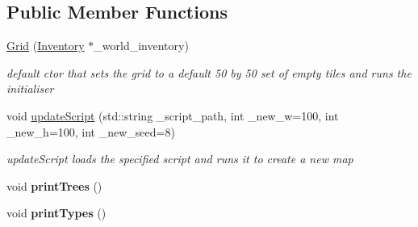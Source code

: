 \subsection*{Public Member Functions}
\begin{DoxyCompactItemize}
\item 
\hypertarget{class_grid_af14a4ade43f6d65ecb752a82b608edb1}{}\hyperlink{class_grid_af14a4ade43f6d65ecb752a82b608edb1}{Grid} (\hyperlink{class_inventory}{Inventory} $\ast$\+\_\+world\+\_\+inventory)\label{class_grid_af14a4ade43f6d65ecb752a82b608edb1}

\begin{DoxyCompactList}\small\item\em default ctor that sets the grid to a default 50 by 50 set of empty tiles and runs the initialiser \end{DoxyCompactList}\item 
void \hyperlink{class_grid_a9b6047de5eb6eda425753ce3a274ddd4}{update\+Script} (std\+::string \+\_\+script\+\_\+path, int \+\_\+new\+\_\+w=100, int \+\_\+new\+\_\+h=100, int \+\_\+new\+\_\+seed=8)
\begin{DoxyCompactList}\small\item\em update\+Script loads the specified script and runs it to create a new map \end{DoxyCompactList}\item 
\hypertarget{class_grid_ae2879c5a643d4521ea198d9ad6ab54d5}{}void {\bfseries print\+Trees} ()\label{class_grid_ae2879c5a643d4521ea198d9ad6ab54d5}

\item 
\hypertarget{class_grid_ac9b8600f35b8c9a526bd7559be5e3b3e}{}void {\bfseries print\+Types} ()\label{class_grid_ac9b8600f35b8c9a526bd7559be5e3b3e}


\end{DoxyCompactItemize}
